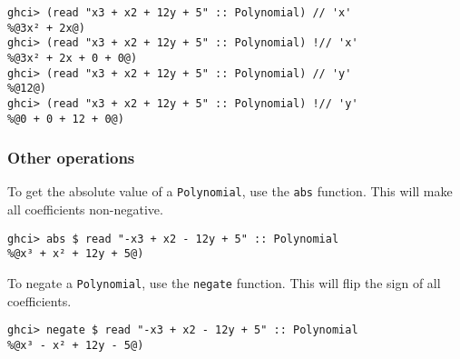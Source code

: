 \documentclass[11pt,a4paper]{article}
\begin{document}
\begin{lstlisting}
ghci> (read "x3 + x2 + 12y + 5" :: Polynomial) // 'x'
%@3x² + 2x@)
ghci> (read "x3 + x2 + 12y + 5" :: Polynomial) !// 'x'
%@3x² + 2x + 0 + 0@)
ghci> (read "x3 + x2 + 12y + 5" :: Polynomial) // 'y'
%@12@)
ghci> (read "x3 + x2 + 12y + 5" :: Polynomial) !// 'y'
%@0 + 0 + 12 + 0@)
\end{lstlisting}

\subsubsection{Other operations}

To get the absolute value of a \lstinline{Polynomial}, use the \lstinline{abs} function.
This will make all coefficients non-negative.

\begin{lstlisting}
ghci> abs $ read "-x3 + x2 - 12y + 5" :: Polynomial
%@x³ + x² + 12y + 5@)
\end{lstlisting}

To negate a \lstinline{Polynomial}, use the \lstinline{negate} function.
This will flip the sign of all coefficients.

\begin{lstlisting}
ghci> negate $ read "-x3 + x2 - 12y + 5" :: Polynomial
%@x³ - x² + 12y - 5@)
\end{lstlisting}
\end{document}
